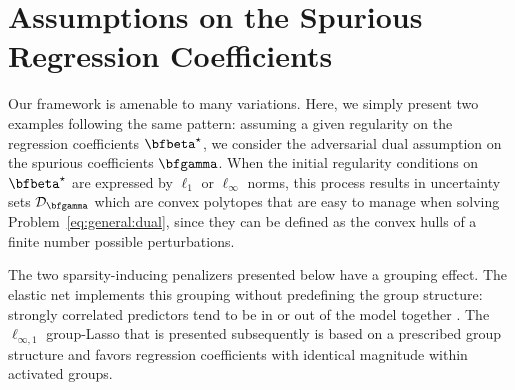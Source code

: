 \section{Assumptions on the Spurious Regression Coefficients \label{sec:quadra}}
\label{sec:gammaperturb}

Our framework is amenable to many variations.
Here, we simply present two examples following the same pattern:
assuming a given regularity on the regression coefficients $\bfbeta^\star$, we
consider the adversarial dual assumption on the spurious coefficients
$\bfgamma$.
When the initial regularity conditions on $\bfbeta^\star$ are expressed by
$\ell_1$ or $\ell_\infty$ norms, this process results in uncertainty sets
$\mathcal{D}_{\bfgamma}$ which are convex polytopes that are
easy to manage when solving Problem~\eqref{eq:general:dual}, since they
can be defined as the convex hulls of a finite number possible perturbations.

The two sparsity-inducing penalizers presented below have a grouping effect.
The elastic net implements this grouping without predefining the group
structure: strongly correlated predictors tend to be in or out of the model
together \citep{2005_JRSS_Zou}.  
The $\ell_{\infty,1}$ group-Lasso that is presented subsequently is based on a
prescribed group structure and favors regression coefficients with identical
magnitude within activated groups.

 

% 



%




%
